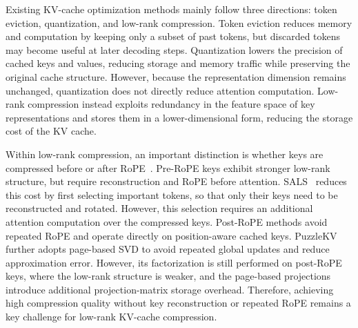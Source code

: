 \documentclass{article} %
\begin{document}

Existing KV-cache optimization methods mainly follow three directions: token eviction, quantization, and low-rank compression. Token eviction reduces memory and computation by keeping only a subset of past tokens, but discarded tokens may become useful at later decoding steps. Quantization lowers the precision of cached keys and values, reducing storage and memory traffic while preserving the original cache structure. However, because the representation dimension remains unchanged, quantization does not directly reduce attention computation. Low-rank compression instead exploits redundancy in the feature space of key representations and stores them in a lower-dimensional form, reducing the storage cost of the KV cache.

Within low-rank compression, an important distinction is whether keys are
compressed before or after RoPE~\citep{rope}. Pre-RoPE keys exhibit stronger low-rank
structure, but require reconstruction and RoPE before attention.
SALS~\citep{mu2025sals} reduces this cost by first selecting important tokens,
so that only their keys need to be reconstructed and rotated. However, this
selection requires an additional attention computation over the compressed
keys. Post-RoPE methods avoid repeated RoPE and operate directly on
position-aware cached keys. PuzzleKV~\citep{puzzlekv} further adopts
page-based SVD to avoid repeated global updates and reduce approximation
error. However, its factorization is still performed on post-RoPE keys, where
the low-rank structure is weaker, and the page-based projections introduce
additional projection-matrix storage overhead. Therefore, achieving high compression quality without key reconstruction or
repeated RoPE remains a key challenge for low-rank KV-cache compression.
 
\end{document}
